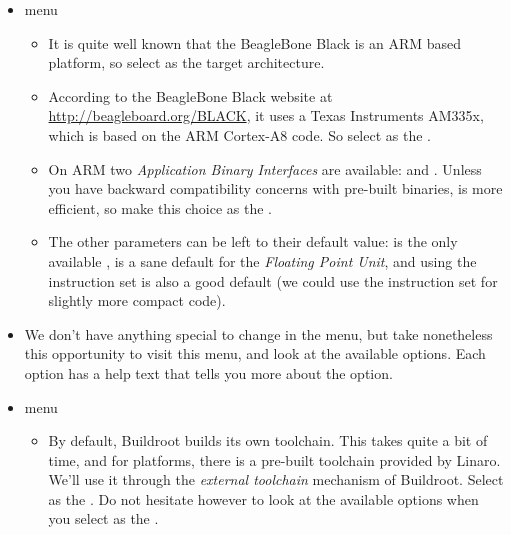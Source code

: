 \begin{itemize}

\item {} menu

  \begin{itemize}

  \item It is quite well known that the BeagleBone Black is an ARM based
    platform, so select  as the target
    architecture.

  \item According to the BeagleBone Black website at
    \url{http://beagleboard.org/BLACK}, it uses a Texas Instruments
    AM335x, which is based on the ARM Cortex-A8 code. So select
     as the .

  \item On ARM two {\em Application Binary Interfaces} are available:
     and . Unless you have backward
    compatibility concerns with pre-built binaries,  is
    more efficient, so make this choice as the .

  \item The other parameters can be left to their default value:
     is the only available ,
     is a sane default for the {\em Floating Point
      Unit}, and using the  instruction set is also a good
    default (we could use the  instruction set for
    slightly more compact code).

  \end{itemize}

\item We don't have anything special to change in the
   menu, but take nonetheless this opportunity to
  visit this menu, and look at the available options. Each option has
  a help text that tells you more about the option.

\item {} menu

  \begin{itemize}

  \item By default, Buildroot builds its own toolchain. This takes
    quite a bit of time, and for  platforms, there is a
    pre-built toolchain provided by Linaro. We'll use it through the
    {\em external toolchain} mechanism of Buildroot. Select
     as the . Do not
    hesitate however to look at the available options when you select
     as the .


\end{itemize}
\end{itemize}
